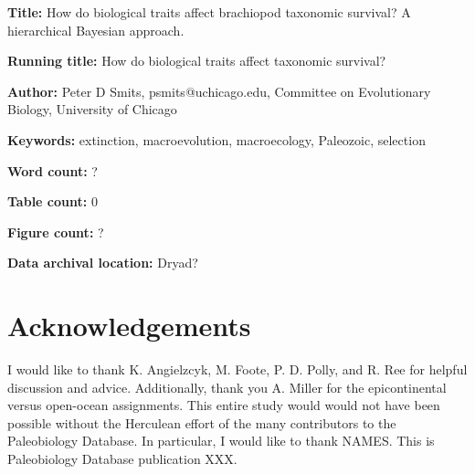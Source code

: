 \documentclass{article}
\begin{document}
\linenumbers
\modulolinenumbers[2]


\begin{titlepage}
  \begin{large}
    \textbf{Title:} How do biological traits affect brachiopod taxonomic survival? A hierarchical Bayesian approach.
  \end{large}

  \textbf{Running title:} How do biological traits affect taxonomic survival?

  \textbf{Author:} Peter D Smits, psmits@uchicago.edu, Committee on Evolutionary Biology, University of Chicago

  \textbf{Keywords:} extinction, macroevolution, macroecology, Paleozoic, selection

  \textbf{Word count:} ?
  
  \textbf{Table count:} 0
 
  \textbf{Figure count:} ?

  \textbf{Data archival location:} Dryad?

\end{titlepage}











\section*{Acknowledgements}
I would like to thank K. Angielzcyk, M. Foote, P. D. Polly, and R. Ree for helpful discussion and advice. Additionally, thank you A. Miller for the epicontinental versus open-ocean assignments. This entire study would would not have been possible without the Herculean effort of the many contributors to the Paleobiology Database. In particular, I would like to thank NAMES. This is Paleobiology Database publication XXX.

\clearpage




\clearpage

\appendix

\end{document}
